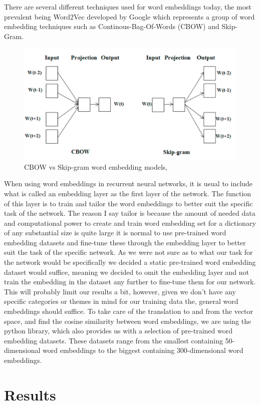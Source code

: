 \documentclass[12pt]{article}
\begin{document}
There are several different techniques used for word embeddings today, the most prevalent being Word2Vec developed by Google which represents a group of word embedding techniques such as Continous-Bag-Of-Words (CBOW) and Skip-Gram. 

\begin{figure}
    \centering
    \includegraphics[width=0.5\linewidth]{figures/skip_gram_vs_cbow.png}
    \caption{CBOW vs Skip-gram word embedding models, \cite{jatnika_word2vec_2019}}
    \label{fig:enter-label}
\end{figure}

When using word embeddings in recurrent neural networks, it is usual to include what is called an embedding layer as the first layer of the network. The function of this layer is to train and tailor the word embeddings to better suit the specific task of the network. The reason I say tailor is because the amount of needed data and computational power to create and train word embedding set for a dictionary of any substantial size is quite large it is normal to use pre-trained word embedding datasets and fine-tune these through the embedding layer to better suit the task of the specific network. As we were not sure as to what our task for the network would be specifically we decided a static pre-trained word embedding dataset would suffice, meaning we decided to omit the embedding layer and not train the embedding in the dataset any further to fine-tune them for our network. This will probably limit our results a bit, however, given we don't have any specific categories or themes in mind for our training data the, general word embeddings should suffice.
To take care of the translation to and from the vector space, and find the cosine similarity between word embeddings, we are using the \cite{ines_montani_explosionspacy_2023} python library, which also provides us with a selection of pre-trained word embedding datasets. These datasets range from the smallest containing 50-dimensional word embeddings to the biggest containing 300-dimensional word embeddings.

\section{Results}
\end{document}
